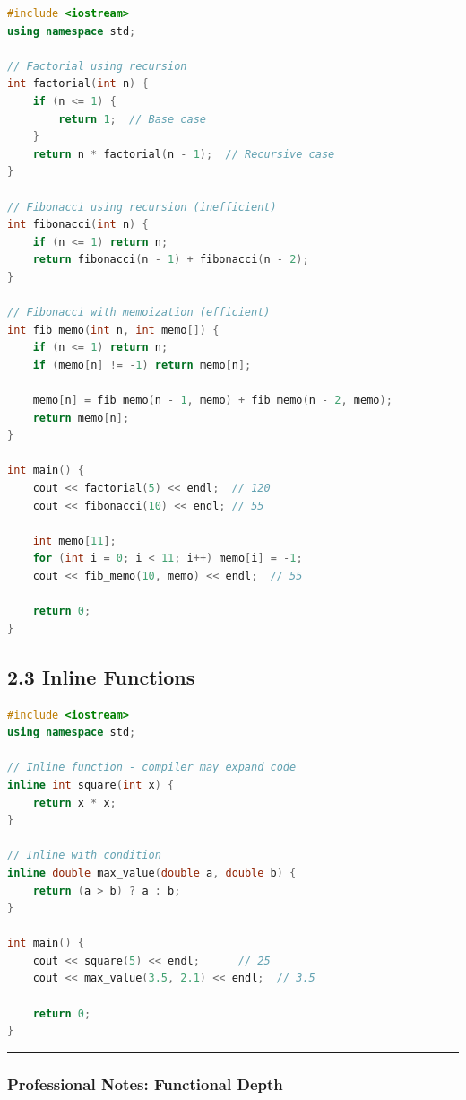 \begin{lstlisting}[language={C++}]
#include <iostream>
using namespace std;

// Factorial using recursion
int factorial(int n) {
    if (n <= 1) {
        return 1;  // Base case
    }
    return n * factorial(n - 1);  // Recursive case
}

// Fibonacci using recursion (inefficient)
int fibonacci(int n) {
    if (n <= 1) return n;
    return fibonacci(n - 1) + fibonacci(n - 2);
}

// Fibonacci with memoization (efficient)
int fib_memo(int n, int memo[]) {
    if (n <= 1) return n;
    if (memo[n] != -1) return memo[n];

    memo[n] = fib_memo(n - 1, memo) + fib_memo(n - 2, memo);
    return memo[n];
}

int main() {
    cout << factorial(5) << endl;  // 120
    cout << fibonacci(10) << endl; // 55

    int memo[11];
    for (int i = 0; i < 11; i++) memo[i] = -1;
    cout << fib_memo(10, memo) << endl;  // 55

    return 0;
}
\end{lstlisting}

\hypertarget{inline-functions}{%
\subsection{2.3 Inline Functions}\label{inline-functions}}

\begin{lstlisting}[language={C++}]
#include <iostream>
using namespace std;

// Inline function - compiler may expand code
inline int square(int x) {
    return x * x;
}

// Inline with condition
inline double max_value(double a, double b) {
    return (a > b) ? a : b;
}

int main() {
    cout << square(5) << endl;      // 25
    cout << max_value(3.5, 2.1) << endl;  // 3.5

    return 0;
}
\end{lstlisting}

\begin{center}\rule{0.5\linewidth}{0.5pt}\end{center}

\hypertarget{professional-notes-functional-depth}{%
\subsubsection{Professional Notes: Functional
Depth}\label{professional-notes-functional-depth}}

